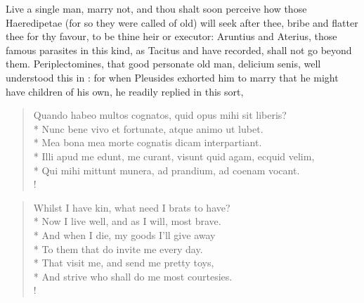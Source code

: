Live a single man, marry not, and thou shalt soon perceive how those
Haeredipetae (for so they were called of old) will seek after thee,
bribe and flatter thee for thy favour, to be thine heir or executor:
Aruntius and Aterius, those famous parasites in this kind, as Tacitus
and \Seneca{} have recorded, shall not go beyond them.
Periplectomines, that good personate old man, delicium senis, well
understood this in \Plautus{}: for when Pleusides exhorted him to marry
that he might have children of his own, he readily replied in this
sort,

\begin{latin}
\begin{verse}%
Quando habeo multos cognatos, quid opus mihi sit liberis?\\*
Nunc bene vivo et fortunate, atque animo ut lubet.\\*
Mea bona mea morte cognatis dicam interpartiant.\\*
Illi apud me edunt, me curant, visunt quid agam, ecquid velim,\\*
Qui mihi mittunt munera, ad prandium, ad coenam vocant.\\!
\end{verse}%
\end{latin}
\translationrule%
\begin{verse}%
Whilst I have kin, what need I brats to have?\\*
Now I live well, and as I will, most brave.\\*
And when I die, my goods I'll give away\\*
To them that do invite me every day.\\*
That visit me, and send me pretty toys,\\*
And strive who shall do me most courtesies.\\!
\end{verse}%

